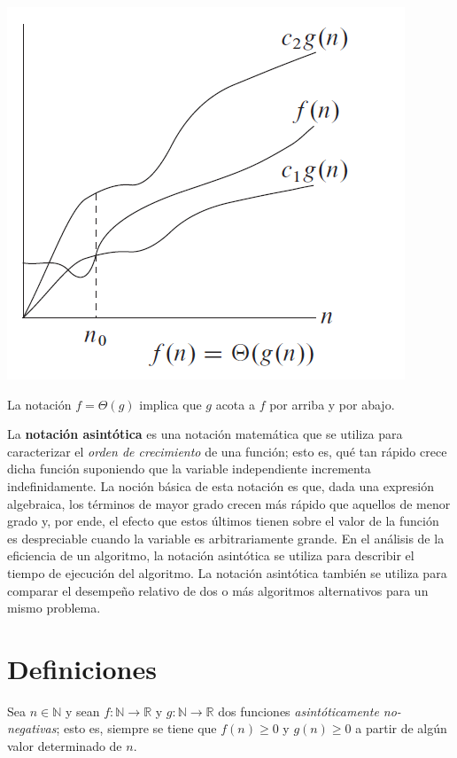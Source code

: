 \begin{marginfigure}
  \includegraphics[width=\linewidth]{figuras/big-theta}
  \caption{La notación \(f=\Theta(g)\) implica que \(g\) acota a \(f\) por arriba y por abajo.}
\end{marginfigure}

La \textbf{notación asintótica} es una notación matemática que se utiliza para caracterizar el \emph{orden de crecimiento} de una función; esto es, qué tan rápido crece dicha función suponiendo que la variable independiente incrementa indefinidamente.
La noción básica de esta notación es que, dada una expresión algebraica, los términos de mayor grado crecen más rápido que aquellos de menor grado y, por ende, el efecto que estos últimos tienen sobre el valor de la función es despreciable cuando la variable es arbitrariamente grande. 
En el análisis de la eficiencia de un algoritmo, la notación asintótica se utiliza para describir el tiempo de ejecución del algoritmo.
La notación asintótica también se utiliza para comparar el desempeño relativo de dos o más algoritmos alternativos para un mismo problema.

\section{Definiciones}

Sea \(n\in\mathbb{N}\) y sean \(f:\mathbb{N}\to\mathbb{R}\) y \(g:\mathbb{N}\to\mathbb{R}\) dos funciones \emph{asintóticamente no-negativas}; esto es, siempre se tiene que \(f(n)\geq 0\) y \(g(n)\geq 0\) a partir de algún valor determinado de \(n\). 

